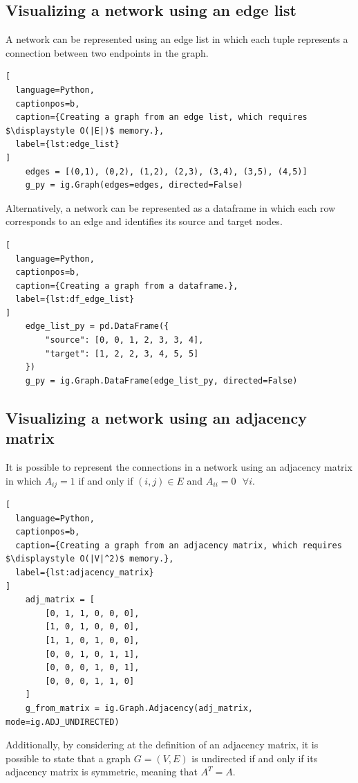 \documentclass{report}
\begin{document}
\subsection{Visualizing a network using an edge list}
A network can be represented using an edge list in which each tuple represents a connection between two endpoints in the graph.
\begin{lstlisting}[
  language=Python,
  captionpos=b,
  caption={Creating a graph from an edge list, which requires $\displaystyle O(|E|)$ memory.},
  label={lst:edge_list}
]
    edges = [(0,1), (0,2), (1,2), (2,3), (3,4), (3,5), (4,5)]
    g_py = ig.Graph(edges=edges, directed=False)
\end{lstlisting}
\noindent Alternatively, a network can be represented as a dataframe in which each row corresponds to an edge and identifies its source and target nodes.
\begin{lstlisting}[
  language=Python,
  captionpos=b,
  caption={Creating a graph from a dataframe.},
  label={lst:df_edge_list}
]
    edge_list_py = pd.DataFrame({
        "source": [0, 0, 1, 2, 3, 3, 4],
        "target": [1, 2, 2, 3, 4, 5, 5]
    })
    g_py = ig.Graph.DataFrame(edge_list_py, directed=False)
\end{lstlisting}
\subsection{Visualizing a network using an adjacency matrix}
It is possible to represent the connections in a network using an adjacency matrix in which $\displaystyle A_{ij} = 1$ if and only if $\displaystyle (i, j) \in E$ and $\displaystyle A_{ii} = 0 \text{ } \forall i$.
\begin{lstlisting}[
  language=Python,
  captionpos=b,
  caption={Creating a graph from an adjacency matrix, which requires $\displaystyle O(|V|^2)$ memory.},
  label={lst:adjacency_matrix}
]
    adj_matrix = [
        [0, 1, 1, 0, 0, 0],
        [1, 0, 1, 0, 0, 0],
        [1, 1, 0, 1, 0, 0],
        [0, 0, 1, 0, 1, 1],
        [0, 0, 0, 1, 0, 1],
        [0, 0, 0, 1, 1, 0]
    ]
    g_from_matrix = ig.Graph.Adjacency(adj_matrix, mode=ig.ADJ_UNDIRECTED)
\end{lstlisting}
\noindent Additionally, by considering at the definition of an adjacency matrix, it is possible to state that a graph $\displaystyle G = (V, E)$ is undirected if and only if its adjacency matrix is symmetric, meaning that $\displaystyle A^T = A$.
\end{document}
